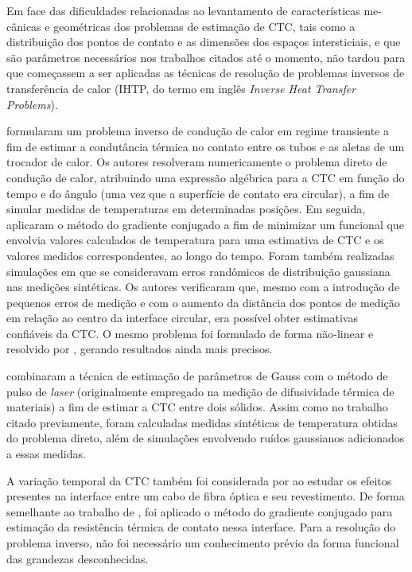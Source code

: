 Em face das dificuldades relacionadas ao levantamento de características me-cânicas e geométricas dos problemas de estimação de CTC, 
tais como a distribuição dos pontos de contato e as dimensões dos espaços intersticiais, e que são parâmetros necessários nos trabalhos citados
até o momento, não tardou para que começassem a ser aplicadas as técnicas de resolução de problemas inversos de transferência de calor (IHTP, do termo em inglês \textit{Inverse Heat Transfer Problems}).

\cite{artigo_huang} formularam um problema inverso de condução de calor em regime transiente a fim de estimar a condutância térmica no contato entre
os tubos e as aletas de um trocador de calor. Os autores resolveram numericamente o problema direto de condução de calor, atribuindo uma expressão
algébrica para a CTC em função do tempo e do ângulo (uma vez que a superfície de contato era circular), a fim de simular medidas de temperaturas
em determinadas posições. Em seguida, aplicaram o método do gradiente conjugado a fim de minimizar um funcional que envolvia valores calculados
de temperatura para uma estimativa de CTC e os valores medidos correspondentes, ao longo do tempo. Foram também realizadas simulações em que se
consideravam erros randômicos de distribuição gaussiana nas medições sintéticas. Os autores verificaram que, mesmo com a introdução de pequenos erros de medição e com
o aumento da distância dos pontos de medição em relação ao centro da interface circular, era possível obter estimativas confiáveis da CTC. O mesmo
problema foi formulado de forma não-linear e resolvido por \cite{artigo_huang_2}, gerando resultados ainda mais precisos.

\cite{artigo_milosevic} combinaram a técnica de estimação de parâmetros de Gauss com o método de pulso de \textit{laser} (originalmente empregado
na medição de difusividade térmica de materiais) a fim de estimar a CTC entre dois sólidos. Assim como no trabalho citado previamente, foram calculadas
medidas sintéticas de temperatura obtidas do problema direto, além de simulações envolvendo ruídos gaussianos adicionados a essas medidas.

A variação temporal da CTC também foi considerada por \cite{artigo_yang} ao estudar os efeitos presentes na interface entre um cabo de
fibra óptica e seu revestimento. De forma semelhante ao trabalho de \cite{artigo_huang}, foi aplicado o método do gradiente conjugado para estimação
da resistência térmica de contato nessa interface. Para a resolução do problema inverso, não foi necessário um conhecimento prévio da forma funcional das grandezas desconhecidas.


